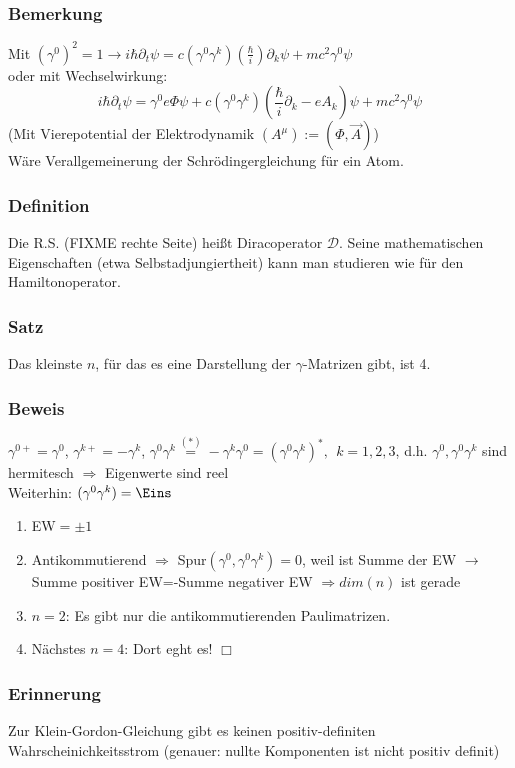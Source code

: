 \documentclass[twoside,a4paper]{scrartcl}
\newcommand{\D}{\mathcal{D}}
\renewcommand{\1}{\mathds{1}}
\newcommand{\Ra}{\Rightarrow}
\newcommand{\ra}{\rightarrow}
\begin{document}
\subsubsection*{Bemerkung}
Mit $(\gamma^0)^2=1 \ra i \hbar \partial_t \psi=c(\gamma^0\gamma^k)(\frac{\hbar}{i})\partial_k \psi+mc^2\gamma^0 \psi$\\
oder mit Wechselwirkung:
$$i\hbar \partial_t \psi=\gamma^0e\Phi\psi+c(\gamma^0\gamma^k)(\frac{\hbar}{i}\partial_k -eA_k)\psi+mc^2\gamma^0 \psi$$
(Mit Vierepotential der Elektrodynamik $(A^\mu):=(\Phi,\vec A)$)\\
Wäre Verallgemeinerung der Schrödingergleichung für ein Atom.
\subsubsection*{Definition}
Die R.S. (FIXME rechte Seite) heißt Diracoperator $\D$. Seine mathematischen Eigenschaften (etwa Selbstadjungiertheit) kann man studieren wie für den Hamiltonoperator.
\subsubsection*{Satz}
Das kleinste $n$, für das es eine Darstellung der $\gamma$-Matrizen gibt, ist 4.
\subsubsection*{Beweis}
$\gamma^{0+}=\gamma^0$, $\gamma^{k+}=-\gamma^k$, $\gamma^0\gamma^k\stackrel{(*)}{=}-\gamma^k\gamma^0=(\gamma^0\gamma^k)^*, \ \ k=1,2,3$, d.h. $\gamma^0, \gamma^0\gamma^k$ sind hermitesch $\Ra$ Eigenwerte sind reel\\
Weiterhin: $(\gamma^0\gamma^k)=\Eins$
\begin{enumerate}
\item EW$=\pm 1$
\item Antikommutierend $\Ra$ Spur$(\gamma^0,\gamma^0\gamma^k)=0$, weil ist Summe der EW $\ra$ Summe positiver EW=-Summe negativer EW $\Ra dim(n)$ ist gerade
\item \underline{$n=2$}: Es gibt nur die antikommutierenden Paulimatrizen.
\item Nächstes \underline{$n=4$}: Dort eght es! $\Box$
\end{enumerate}
\subsubsection*{Erinnerung}
Zur Klein-Gordon-Gleichung gibt es keinen positiv-definiten Wahrscheinichkeitsstrom (genauer: nullte Komponenten ist nicht positiv definit)
\end{document}

